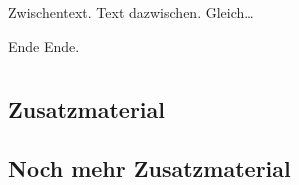 \documentclass[t, aspectratio=169, ngerman]{beamer}
\begin{document}
	\begin{frame}{Zwischentext.}
		Text dazwischen. Gleich\dots
	\end{frame}





	\begin{frame}[plain]{Ende}
		\Huge{Ende.}
	\end{frame}




	\appendix

	\section{\appendixname}

	\frame{\tableofcontents}

	\subsection{Zusatzmaterial}


	\subsection{Noch mehr Zusatzmaterial}

\end{document}
